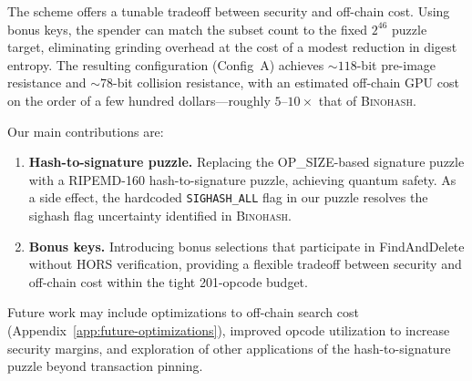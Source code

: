 \documentclass[11pt, a4paper]{article}
\begin{document}
The scheme offers a tunable tradeoff between security and off-chain cost. Using bonus keys, the spender can match the subset count to the fixed $2^{46}$ puzzle target, eliminating grinding overhead at the cost of a modest reduction in digest entropy. The resulting configuration (Config~A) achieves ${\sim}118$-bit pre-image resistance and ${\sim}78$-bit collision resistance, with an estimated off-chain GPU cost on the order of a few hundred dollars---roughly $5$--$10\times$ that of \textsc{Binohash}.

Our main contributions are:

\begin{enumerate}
    \item \textbf{Hash-to-signature puzzle.} Replacing the OP\_SIZE-based signature puzzle with a RIPEMD-160 hash-to-signature puzzle, achieving quantum safety. As a side effect, the hardcoded \texttt{SIGHASH\_ALL} flag in our puzzle resolves the sighash flag uncertainty identified in \textsc{Binohash}.

    \item \textbf{Bonus keys.} Introducing bonus selections that participate in FindAndDelete without HORS verification, providing a flexible tradeoff between security and off-chain cost within the tight 201-opcode budget.
\end{enumerate}

Future work may include optimizations to off-chain search cost (Appendix~\ref{app:future-optimizations}), improved opcode utilization to increase security margins, and exploration of other applications of the hash-to-signature puzzle beyond transaction pinning.
\end{document}
